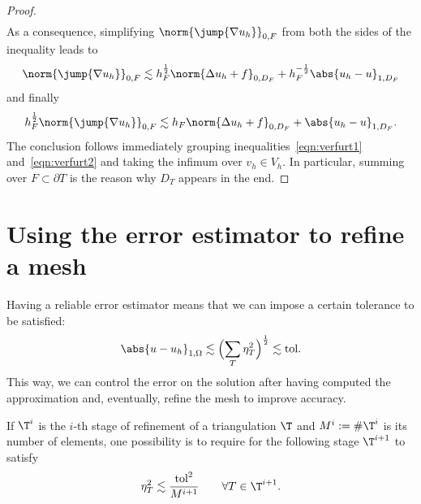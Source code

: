 \begin{proof}
\begin{align}
    \end{align}
    As a consequence, simplifying $\norm{\jump{\nabla u_h}}_{0,F}$ from both the sides of the inequality leads to
    \[
    \norm{\jump{\nabla u_h}}_{0,F} \lesssim h_F^\frac{1}{2} \norm{\Delta u_h + f}_{0,D_F} 
    + h_F^{-\frac{1}{2}} \abs{u_h - u}_{1,D_F}
    \]
    and finally
    \begin{equation}\label{eqn:verfurt2}
    h_F^\frac{1}{2} \norm{\jump{\nabla u_h}}_{0,F}
    \lesssim h_F \norm{\Delta u_h + f}_{0,D_F} + \abs{u_h - u}_{1,D_F}.
    \end{equation}
    The conclusion follows immediately grouping inequalities~\eqref{eqn:verfurt1} and~\eqref{eqn:verfurt2} and taking the infimum over $v_h \in V_h$. In particular, summing over $F\subset \partial T$ is the reason why $D_T$ appears in the end.
\end{proof}


\section{Using the error estimator to refine a mesh}

Having a reliable error estimator means that we can impose a certain tolerance to be satisfied:
\[
\abs{u - u_h}_{1,\Omega} \lesssim \Bigl( \sum_T \eta_T^2 \Bigr)^\frac{1}{2} \lesssim \text{tol}.
\]
This way, we can control the error on the solution after having computed the approximation and, eventually, refine the mesh to improve accuracy.

If $\T^i$ is the $i$-th stage of refinement of a triangulation $\T$ and $M^i := \#\T^i$ is its number of elements, one possibility is to require for the following stage $\T^{i+1}$ to satisfy
\[
\eta_T^2 \lesssim \frac{\text{tol}^2}{M^{i+1}} \qquad \forall T \in \T^{i+1}.
\]

